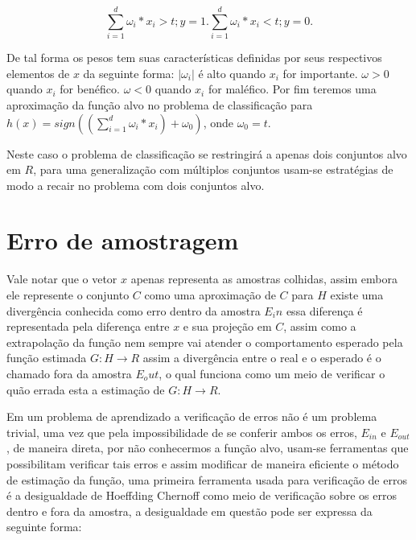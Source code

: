 \documentclass[pfc]{imetex}
\begin{document}
    \begin{equation}
        \sum\limits_{i=1}^d \omega_i*x_i>t; y = 1.
        \sum\limits_{i=1}^d \omega_i*x_i<t; y = 0.
    \end{equation}

    De tal forma os pesos tem suas características definidas por seus respectivos elementos de $x$ da seguinte forma:\newline
    $|\omega_i|$ é alto quando $x_i$ for importante.\newline
    $\omega > 0$ quando $x_i$ for benéfico.\newline
    $\omega < 0$ quando $x_i$ for maléfico.\newline
    Por fim teremos uma aproximação da função alvo no problema de classificação para $h(x) = sign((\sum\limits_{i=1}^d \omega_i*x_i)+\omega_0)$, onde $\omega_0 = t$.

    Neste caso o problema de classificação se restringirá a apenas dois conjuntos alvo em $R$, para uma generalização com múltiplos conjuntos usam-se estratégias de modo a recair no problema com dois conjuntos alvo.

\section{Erro de amostragem}

    Vale notar que o vetor $x$ apenas representa as amostras colhidas, assim embora ele represente o conjunto $C$ como uma aproximação de $C$ para $H$ existe uma divergência conhecida como erro dentro da amostra $E_in$ essa diferença é representada pela diferença entre $x$ e sua projeção em $C$, assim como a extrapolação da função nem sempre vai atender o comportamento esperado pela função estimada $G: H \rightarrow R$ assim a divergência entre o real e o esperado é o chamado fora da amostra $E_out$, o qual funciona como um meio de verificar o quão errada esta a estimação de $G: H \rightarrow R$.

    Em um problema de aprendizado a verificação de erros não é um problema trivial, uma vez que pela impossibilidade de se conferir ambos os erros, $E_{in}$ e $E_{out}$, de maneira direta, por não conhecermos a função alvo, usam-se ferramentas que possibilitam verificar tais erros e assim modificar de maneira eficiente o método de estimação da função, uma primeira ferramenta usada para verificação de erros é a desigualdade de Hoeffding Chernoff como meio de verificação sobre os erros dentro e fora da amostra, a desigualdade em questão pode ser expressa da seguinte forma:
\end{document}
